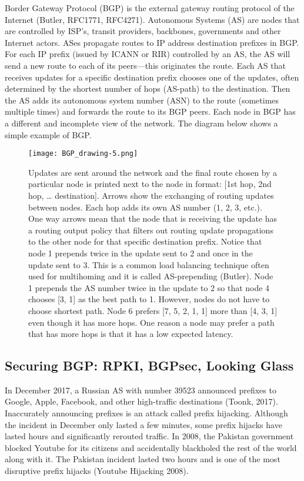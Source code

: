 \documentclass[letterpaper, 10 pt, conference]{ieeeconf}  %
\begin{document}
Border Gateway Protocol (BGP) is the external gateway routing protocol of the Internet (Butler, RFC1771, RFC4271). Autonomous Systems (AS) are nodes that are controlled by ISP’s, transit providers, backbones, governments and other Internet actors. ASes propagate routes to IP address destination prefixes in BGP. For each IP prefix (issued by ICANN or RIR) controlled by an AS, the AS will send a new route to each of its peers---this originates the route. Each AS that receives updates for a specific destination prefix chooses one of the updates, often determined by the shortest number of hops (AS-path) to the destination. Then the AS adds its autonomous system number (ASN) to the route (sometimes multiple times) and forwards the route to its BGP peers. Each node in BGP has a different and incomplete view of the network. The diagram below shows a simple example of BGP.

\begin{figure}[h!]
	\centering
	\texttt{[image: BGP\_drawing-5.png]}
\caption{Updates are sent around the network and the final route chosen by a particular node is printed next to the node in format: [1st hop, 2nd hop, … destination]. Arrows show the exchanging of routing updates between nodes. Each hop adds its own AS number (1, 2, 3, etc.). One way arrows mean that the node that is receiving the update has a routing output policy that filters out routing update propagations to the other node for that specific destination prefix. Notice that node 1 prepends twice in the update sent to 2 and once in the update sent to 3. This is a common load balancing technique often used for multihoming and it is called AS-prepending (Butler). Node 1 prepends the AS number twice in the update to 2 so that node 4 chooses [3, 1] as the best path to 1. However, nodes do not have to choose shortest path. Node 6 prefers [7, 5, 2, 1, 1] more than [4, 3, 1] even though it has more hops. One reason a node may prefer a path that has more hops is that it has a low expected latency. 
}
\end{figure}



\subsection{Securing BGP: RPKI, BGPsec, Looking Glass}

In December 2017, a Russian AS with number 39523 announced prefixes to Google, Apple, Facebook, and other high-traffic destinations (Toonk, 2017). Inaccurately announcing prefixes is an attack called prefix hijacking. Although the incident in December only lasted a few minutes, some prefix hijacks have lasted hours and significantly rerouted traffic. In 2008, the Pakistan government blocked Youtube for its citizens and accidentally blackholed the rest of the world along with it. The Pakistan incident lasted two hours and is one of the most disruptive prefix hijacks (Youtube
Hijacking 2008). 
\end{document}
